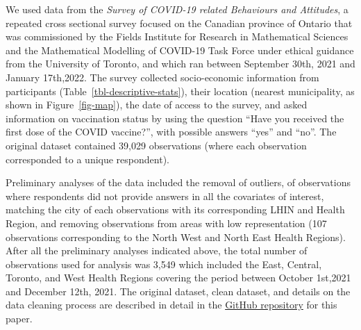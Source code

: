 \documentclass[
  letterpaper,
  DIV=11,
  numbers=noendperiod]{scrartcl}
\begin{document}
We used data from the \emph{Survey of COVID-19 related Behaviours and
Attitudes}, a repeated cross sectional survey focused on the Canadian
province of Ontario that was commissioned by the Fields Institute for
Research in Mathematical Sciences and the Mathematical Modelling of
COVID-19 Task Force under ethical guidance from the University of
Toronto, and which ran between September 30th, 2021 and January
17th,2022. The survey collected socio-economic information from
participants (Table~\ref{tbl-descriptive-stats}), their location
(nearest municipality, as shown in Figure~\ref{fig-map}), the date of
access to the survey, and asked information on vaccination status by
using the question ``Have you received the first dose of the COVID
vaccine?'', with possible answers ``yes'' and ``no''. The original
dataset contained 39,029 observations (where each observation
corresponded to a unique respondent).

Preliminary analyses of the data included the removal of outliers, of
observations where respondents did not provide answers in all the
covariates of interest, matching the city of each observations with its
corresponding LHIN and Health Region, and removing observations from
areas with low representation (107 observations corresponding to the
North West and North East Health Regions). After all the preliminary
analyses indicated above, the total number of observations used for
analysis was 3,549 which included the East, Central, Toronto, and West
Health Regions covering the period between October 1st,2021 and December
12th, 2021. The original dataset, clean dataset, and details on the data
cleaning process are described in detail in the
\href{https://github.com/aimundo/Fields_COVID-19/}{GitHub repository}
for this paper.
\end{document}
